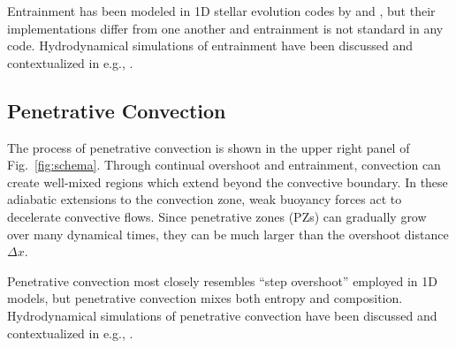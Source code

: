 Entrainment has been modeled in 1D stellar evolution codes by \citet{staritsin_2013} and \citet{scott_etal_2021}, but their implementations differ from one another and entrainment is not standard in any code.
Hydrodynamical simulations of entrainment have been discussed and contextualized in e.g., \citet{fuentes_cumming_2020}.


\subsection{Penetrative Convection}
The process of penetrative convection is shown in the upper right panel of Fig.~\ref{fig:schema}.
Through continual overshoot and entrainment, convection can create well-mixed regions which extend beyond the convective boundary.
In these adiabatic extensions to the convection zone, weak buoyancy forces act to decelerate convective flows.
Since penetrative zones (PZs) can gradually grow over many dynamical times, they can be much larger than the overshoot distance $\Delta x$.

Penetrative convection most closely resembles ``step overshoot'' employed in 1D models, but penetrative convection mixes both entropy and composition.
Hydrodynamical simulations of penetrative convection have been discussed and contextualized in e.g., \citet{anders_etal_2021}.
